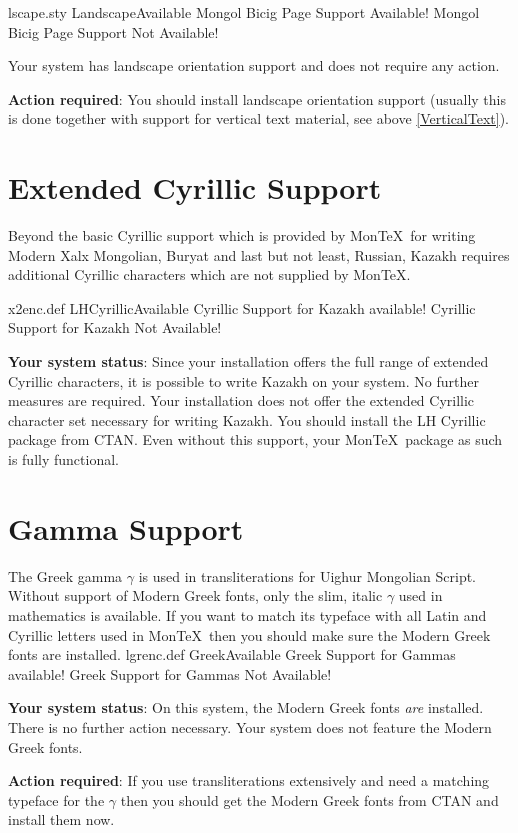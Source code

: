 \documentclass[a4paper,11pt]{article}
\begin{document}
	\PackageDiagnostics%
		{lscape.sty}				%
		{LandscapeAvailable}			%
		{Mongol Bicig Page Support Available!}	%
		{Mongol Bicig Page Support Not Available!}%

	\ifnum{}
		Your system has landscape orientation support and
		does not require any action.
	\else

		\textbf{Action required}:
		You should install landscape orientation support
		(usually this is done together with support for
		vertical text material, see above \ref{VerticalText}).
	\fi
\fi


\section{Extended Cyrillic Support}

Beyond the basic Cyrillic support which is provided by Mon\TeX\ for
writing Modern Xalx Mongolian, Buryat and last but not least, Russian,
Kazakh requires additional Cyrillic characters which are not supplied
by Mon\TeX.

\PackageDiagnostics%
	{x2enc.def}				%
	{LHCyrillicAvailable}			%
	{Cyrillic Support for Kazakh available!}%
	{Cyrillic Support for Kazakh Not Available!}%

\textbf{Your system status}:
\ifnum{}
	Since your installation offers the full range of extended
	Cyrillic characters, it is possible to write Kazakh on your 
	system. No further measures are required.
\else
	Your installation does not offer the extended Cyrillic character
	set necessary for writing Kazakh. You should install the LH
	Cyrillic package from CTAN. Even without this support, your
	Mon\TeX\ package as such is fully functional.
\fi

\section{Gamma Support}

The Greek gamma $\gamma$ is used in transliterations for Uighur 
Mongolian Script. Without support of Modern Greek fonts, only
the slim, italic $\gamma$ used in mathematics is available.
If you want to match its typeface with all Latin and Cyrillic
letters used in Mon\TeX\ then you should make sure the Modern
Greek fonts are installed.
%
\PackageDiagnostics%
	{lgrenc.def}				%
	{GreekAvailable}			%
	{Greek Support for Gammas available!}%
	{Greek Support for Gammas Not Available!}%

\textbf{Your system status}:
\ifnum{}
	On this system, the Modern Greek fonts \textit{are} installed.
	There is no further action necessary.
\else
	Your system does not feature the Modern Greek fonts.

	\textbf{Action required}:
	If you use transliterations extensively and need a matching
	typeface for the $\gamma$ then you should get the Modern
	Greek fonts from CTAN and install them now.
\fi
\end{document}
